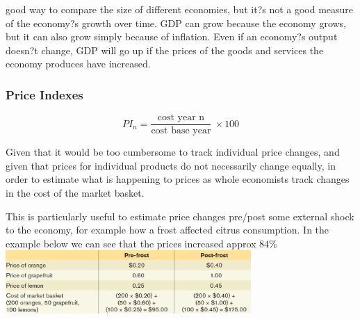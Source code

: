 \documentclass[english,course]{Notes}
\begin{document}
\par{good way to compare the size of
different economies, but it?s not a good measure of the economy?s growth over
time. GDP can grow because the economy grows, but it can also grow simply
because of inflation. Even if an economy?s output doesn?t change, GDP will go
up if the prices of the goods and services the economy produces have increased.}





\subsubsection{Price Indexes}




$$PI_{n} = \frac{\text{cost year n}}{\text{cost base year}} \ \times 100$$

\par{Given that it would be too cumbersome to track individual price changes, and given that prices for individual products do not necessarily change equally, in order to estimate what is happening to prices as whole economists track changes in the cost of the market basket.}
\par{This is particularly useful to estimate price changes pre/post some external shock to the economy, for example how a frost affected citrus consumption. In the example below we can see that the prices increased approx $84\%$} 
\includegraphics[width=0.7\textwidth]{CPI}
\end{document}
